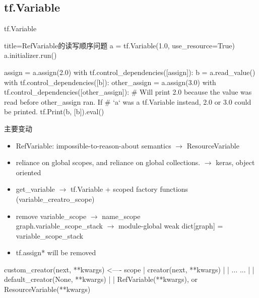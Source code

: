 
\subsection{tf.Variable}

\begin{frame}[fragile]{tf.Variable}
    \begin{tcblisting}{title=RefVariable的读写顺序问题}
        a = tf.Variable(1.0, use_resource=True)
        a.initializer.run()

        assign = a.assign(2.0)
        with tf.control_dependencies([assign]):
          b = a.read_value()
        with tf.control_dependencies([b]):
          other_assign = a.assign(3.0)
        with tf.control_dependencies([other_assign]):
          # Will print 2.0 because the value was read before other_assign ran. If
          # `a` was a tf.Variable instead, 2.0 or 3.0 could be printed.
          tf.Print(b, [b]).eval()
    \end{tcblisting}
\end{frame}

\begin{frame}{主要变动}
    \begin{itemize}
        \item RefVariable: impossible-to-reason-about semantics $\to$ ResourceVariable
        \item reliance on global scopes, and reliance on global collections. $\to$ keras, object oriented
        \item get\_variable  $\to$ tf.Variable + scoped factory functions (variable\_creatro\_scope)
        \item remove variable\_scope $\to$ name\_scope \\
            graph.variable\_scope\_stack $\to$ module-global weak dict[graph] = variable\_scope\_stack
        \item tf.assign* will be removed
    \end{itemize}
\end{frame}

\begin{frame}[fragile]
    \begin{tcblisting}{}
        custom_creator(next, **kwargs)        <---- scope
                        |
                    creator(next, **kwargs)
                             |
                             |
                          ... ...
                             |
                             |
                         default_creator(None, **kwargs)
                                     |
                                     |
                             RefVariable(**kwargs), or
                             ResourceVariable(**kwargs)
    \end{tcblisting}
\end{frame}

